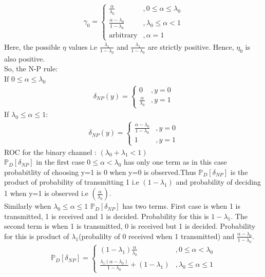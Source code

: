 \documentclass[12pt]{report}
\begin{document}
\begin{align*}
\gamma_0=\left\{
\begin{array}{cc}
\frac{\alpha}{\lambda_0}  &, 0\leq\alpha\leq\lambda_0\\
\frac{\alpha-\lambda_0}{1-\lambda_0}  &, \lambda_0\leq\alpha<1\\
\text{arbitrary} &, \alpha=1
\end{array}\right.
\end{align*}
Here, the possible $\eta$ values i.e $\frac{\lambda_1}{1-\lambda_0}$ and $\frac{\lambda_1}{1-\lambda_0}$ are strictly positive. Hence, $\eta_0$ is also positive.\\
So, the N-P rule:\\ If 0$\leq\alpha\leq\lambda_0$\\[-10pt]
\begin{align*}
\delta_{NP}(y)=\left\{
\begin{array}{cc}
0 &, y=0\\
\frac{\alpha}{\lambda_0} &,y=1
\end{array}\right.
\end{align*}
If $\lambda_0\leq\alpha\leq1$:\\[-10pt]
\begin{align*}
\delta_{NP}(y)=\left\{
\begin{array}{cc}
\frac{\alpha-\lambda_0}{1-\lambda_0} &, y=0\\
1 &, y=1
\end{array}\right.
\end{align*}
ROC for the binary channel : $(\lambda_0+\lambda_1<1)$\\
$\mathbb{P}_D[\delta_{NP}]$ in the first case $0\leq\alpha<\lambda_0$ has only one term as in this case probabitlity of choosing y=1 is 0 when y=0 is observed.Thus $\mathbb{P}_D[\delta_{NP}]$ is the product of probability of transmitting 1 i.e $(1-\lambda_1)$ and probability of deciding 1 when y=1 is observed i.e $(\frac{\alpha}{\lambda_0}).$\\
Similarly when $\lambda_0\leq\alpha\leq1$ $\mathbb{P}_D[\delta_{NP}]$ has two terms. First case is when 1 is transmitted, 1 is received and 1 is decided. Probability for this is  ${1-\lambda_1}$. The second term is when 1 is transmitted, 0 is received but 1 is decided. Probability for this is product of ${\lambda_1}$(probalilty of 0 received when 1 transmitted) and $\frac{\alpha-\lambda_0}{1-\lambda_0}$.
\begin{align*}
\mathbb{P}_D[\delta_{NP}]=\left\{
\begin{array}{cc}
(1-\lambda_1)\frac{\alpha}{\lambda_0} &, 0\leq\alpha<\lambda_0\\
\frac{\lambda_1(\alpha-\lambda_0)}{1-\lambda_0}+(1-\lambda_1) &, \lambda_0\leq\alpha\leq1
\end{array}\right.
\end{align*}
\end{document}
